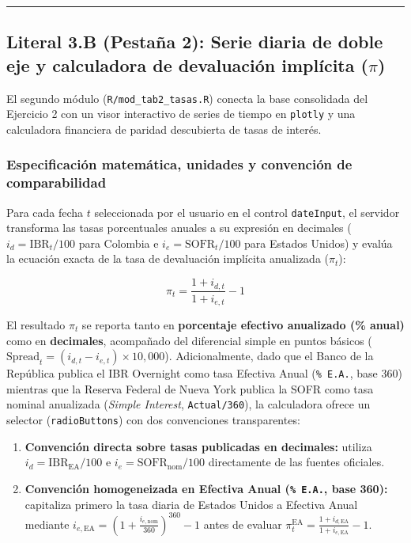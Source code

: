 \documentclass[
  10pt,
  letterpaper,
  DIV=11,
  numbers=noendperiod]{scrartcl}
\providecommand{\tightlist}{%
  \setlength{\itemsep}{0pt}\setlength{\parskip}{0pt}}
\begin{document}
\begin{center}\rule{0.5\linewidth}{0.5pt}\end{center}

\subsection{\texorpdfstring{Literal 3.B (Pestaña 2): Serie diaria de
doble eje y calculadora de devaluación implícita
(\(\pi\))}{Literal 3.B (Pestaña 2): Serie diaria de doble eje y calculadora de devaluación implícita (\textbackslash pi)}}\label{literal-3.b-pestauxf1a-2-serie-diaria-de-doble-eje-y-calculadora-de-devaluaciuxf3n-impluxedcita-pi}

El segundo módulo (\texttt{R/mod\_tab2\_tasas.R}) conecta la base
consolidada del Ejercicio 2 con un visor interactivo de series de tiempo
en \texttt{plotly} y una calculadora financiera de paridad descubierta
de tasas de interés.

\subsubsection{Especificación matemática, unidades y convención de
comparabilidad}\label{especificaciuxf3n-matemuxe1tica-unidades-y-convenciuxf3n-de-comparabilidad}

Para cada fecha \(t\) seleccionada por el usuario en el control
\texttt{dateInput}, el servidor transforma las tasas porcentuales
anuales a su expresión en decimales (\(i_d = \text{IBR}_t / 100\) para
Colombia e \(i_e = \text{SOFR}_t / 100\) para Estados Unidos) y evalúa
la ecuación exacta de la tasa de devaluación implícita anualizada
(\(\pi_t\)):

\[\pi_t = \frac{1 + i_{d,t}}{1 + i_{e,t}} - 1\]

El resultado \(\pi_t\) se reporta tanto en \textbf{porcentaje efectivo
anualizado (\% anual)} como en \textbf{decimales}, acompañado del
diferencial simple en puntos básicos
(\(\text{Spread}_t = (i_{d,t} - i_{e,t}) \times 10,000\)).
Adicionalmente, dado que el Banco de la República publica el IBR
Overnight como tasa Efectiva Anual (\texttt{\%\ E.A.}, base 360)
mientras que la Reserva Federal de Nueva York publica la SOFR como tasa
nominal anualizada (\emph{Simple Interest}, \texttt{Actual/360}), la
calculadora ofrece un selector (\texttt{radioButtons}) con dos
convenciones transparentes:

\begin{enumerate}
\def\labelenumi{\arabic{enumi}.}
\tightlist
\item
  \textbf{Convención directa sobre tasas publicadas en decimales:}
  utiliza \(i_d = \text{IBR}_{\text{EA}}/100\) e
  \(i_e = \text{SOFR}_{\text{nom}}/100\) directamente de las fuentes
  oficiales.
\item
  \textbf{Convención homogeneizada en Efectiva Anual (\texttt{\%\ E.A.},
  base 360):} capitaliza primero la tasa diaria de Estados Unidos a
  Efectiva Anual mediante
  \(i_{e,\text{EA}} = \left(1 + \frac{i_{e,\text{nom}}}{360}\right)^{360} - 1\)
  antes de evaluar
  \(\pi_t^{\text{EA}} = \frac{1 + i_{d,\text{EA}}}{1 + i_{e,\text{EA}}} - 1\).
\end{enumerate}
\end{document}

